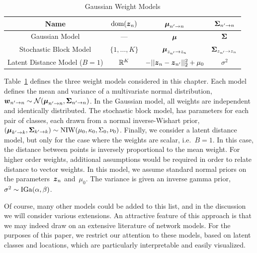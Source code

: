 \begin{table}
\begin{center}
\begin{tabular}{c|c|c|c}
Name & $\text{dom}(\boldsymbol{z}_n)$ & $\boldsymbol{\mu}_{n' \to n}$ & $\boldsymbol{\Sigma}_{n' \to n}$\\
\hline
Gaussian Model & --- & $\boldsymbol{\mu}$ & $\boldsymbol{\Sigma}$ \\
Stochastic Block Model & $\{1, \ldots, K\}$ & $\boldsymbol{\mu}_{z_{n'} \to z_n}$ & $\boldsymbol{\Sigma}_{z_{n'} \to z_n}$ \\
Latent Distance Model (${B=1}$) & $\mathbb{R}^K $ & $-||\boldsymbol{z}_n - \boldsymbol{z}_{n'}||_2^2 + \mu_0$ & $\sigma^2$
\end{tabular}
\end{center}
\caption{Gaussian Weight Models}
\label{tab:gauss_W_models}
\end{table}

Table~\ref{tab:gauss_W_models} defines the three weight models considered in this chapter.  
Each model defines the mean and variance of a multivariate
normal distribution,~${\boldsymbol{w}_{n' \to n} \sim \mathcal{N}(\boldsymbol{\mu}_{n' \to
  n}, \boldsymbol{\Sigma}_{n' \to n})}$.  In the Gaussian model, all weights are
independent and identically distributed.  The stochastic block model,
has parameters for each pair of classes, each drawn from a normal
inverse-Wishart prior,~${(\boldsymbol{\mu}_{k' \to k}, \boldsymbol{\Sigma}_{k' \to k}) \sim
\mathrm{NIW}(\mu_0, \kappa_0, \Sigma_0, \nu_0)}$. Finally, we
consider a latent distance model, but only for the case where the
weights are scalar, i.e.~$B=1$. In this case, the distance between
points is inversely proportional to the mean weight.  For higher order
weights, additional assumptions would be required in order to relate
distance to vector weights. In this model, we assume standard normal
priors on the parameters~$\boldsymbol{z}_n$ and~$\mu_0$.  The variance is given
an inverse gamma prior,~$\sigma^2 \sim \mathrm{IGa}(\alpha, \beta)$.

Of course, many other models could be added to this list, and in the
discussion we will consider various extensions. An attractive feature
of this approach is that we may indeed draw on an extensive literature
of network models. For the purposes of this paper, we restrict our
attention to these models, based on latent classes and locations,
which are particularly interpretable and easily visualized.



